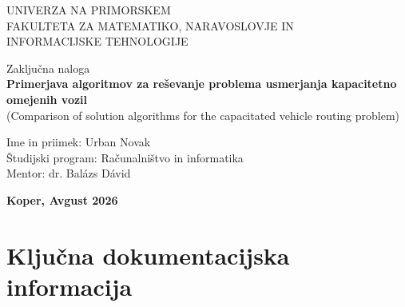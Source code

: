 \documentclass[12pt,a4paper,titlepage,openany]{report}
\begin{document}
\pagestyle{empty}
\begin{center}
\noindent \large UNIVERZA NA PRIMORSKEM\\
\large FAKULTETA ZA MATEMATIKO, NARAVOSLOVJE IN\\
INFORMACIJSKE TEHNOLOGIJE


\normalsize
\vspace{6cm}
Zaključna naloga\\
\textbf{\large Primerjava algoritmov za reševanje problema usmerjanja kapacitetno omejenih vozil}\\
\normalsize
(Comparison of solution algorithms for the capacitated vehicle routing problem)\\
\end{center}

\begin{flushleft}
\vspace{5cm}
\noindent Ime in priimek: Urban Novak
\\
\noindent Študijski program: Računalništvo in informatika
\\
\noindent Mentor: dr. Balázs Dávid
\\
\end{flushleft}

\vspace{4cm}
\begin{center}
\large \textbf{Koper, Avgust 2026}
\end{center}
\newpage

\pagestyle{fancy}

\section*{Ključna dokumentacijska informacija}
\end{document}
